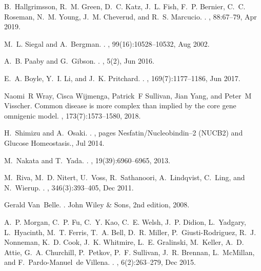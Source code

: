 \documentclass[
]{article}
\begin{document}
\begin{thebibliography}{100}
B.~Hallgrimsson, R.~M. Green, D.~C. Katz, J.~L. Fish, F.~P. Bernier, C.~C.
  Roseman, N.~M. Young, J.~M. Cheverud, and R.~S. Marcucio.
.
, 88:67--79, Apr 2019.

M.~L. Siegal and A.~Bergman.
.
, 99(16):10528--10532, Aug 2002.

A.~B. Paaby and G.~Gibson.
.
, 5(2), Jun 2016.

E.~A. Boyle, Y.~I. Li, and J.~K. Pritchard.
.
, 169(7):1177--1186, Jun 2017.

Naomi~R Wray, Cisca Wijmenga, Patrick~F Sullivan, Jian Yang, and Peter~M
  Visscher.
\newblock Common disease is more complex than implied by the core gene
  omnigenic model.
, 173(7):1573--1580, 2018.

H.~Shimizu and A.~Osaki.
.
, pages Nesfatin/Nucleobindin--2 (NUCB2) and
  Glucose Homeostasis., Jul 2014.

M.~Nakata and T.~Yada.
.
, 19(39):6960--6965, 2013.

M.~Riva, M.~D. Nitert, U.~Voss, R.~Sathanoori, A.~Lindqvist, C.~Ling, and
  N.~Wierup.
.
, 346(3):393--405, Dec 2011.

Gerald Van~Belle.
.
\newblock John Wiley \& Sons, 2nd edition, 2008.

A.~P. Morgan, C.~P. Fu, C.~Y. Kao, C.~E. Welsh, J.~P. Didion, L.~Yadgary,
  L.~Hyacinth, M.~T. Ferris, T.~A. Bell, D.~R. Miller, P.~Giusti-Rodriguez,
  R.~J. Nonneman, K.~D. Cook, J.~K. Whitmire, L.~E. Gralinski, M.~Keller, A.~D.
  Attie, G.~A. Churchill, P.~Petkov, P.~F. Sullivan, J.~R. Brennan,
  L.~McMillan, and F.~Pardo-Manuel~de Villena.
.
, 6(2):263--279, Dec 2015.


\end{thebibliography}
\end{document}
